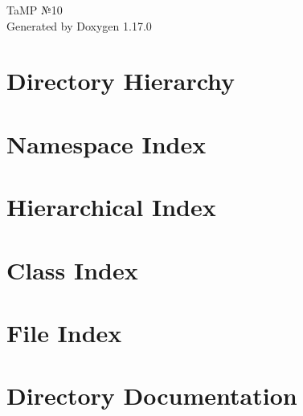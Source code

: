 \documentclass[twoside]{book}
\newcommand{\+}{\discretionary{\mbox{\scriptsize$\hookleftarrow$}}{}{}}
\newcommand{\clearemptydoublepage}{%
    \newpage{\pagestyle{empty}\cleardoublepage}%
  }
\begin{document}
  \raggedbottom
    \hypersetup{pageanchor=false,
                bookmarksnumbered=true,
                pdfencoding=unicode
               }
  \begin{titlepage}
  \vspace*{7cm}
  \begin{center}%
  {\Large Ta\+MP №10}\\
  \vspace*{1cm}
  {\large Generated by Doxygen 1.17.0}\\
  \end{center}
  \end{titlepage}
  \clearemptydoublepage
  \tableofcontents
  \clearemptydoublepage
  \hypersetup{pageanchor=true}


\chapter{Directory Hierarchy}

\chapter{Namespace Index}

\chapter{Hierarchical Index}

\chapter{Class Index}

\chapter{File Index}

\chapter{Directory Documentation}









\end{document}
